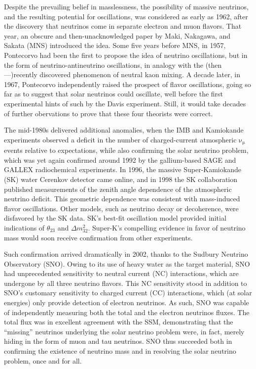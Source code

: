 \documentclass[../thesis.tex]{subfiles}
\begin{document}
Despite the prevailing belief in masslessness, the possibility of massive neutrinos, and the resulting potential for oscillations, was considered as early as 1962, after the discovery that neutrinos come in separate electron and muon flavors. That year, an obscure and then-unacknowledged paper by Maki, Nakagawa, and Sakata (MNS) introduced the idea. Some five years before MNS, in 1957, Pontecorvo had been the first to propose the idea of neutrino oscillations, but in the form of neutrino-antineutrino oscillations, in analogy with the (then---)recently discovered phenomenon of neutral kaon mixing. A decade later, in 1967, Pontecorvo independently raised the prospect of flavor oscillations, going so far as to suggest that solar neutrinos could oscillate, well before the first experimental hints of such by the Davis experiment. Still, it would take decades of further obervations to prove that these four theorists were correct.

The mid-1980s delivered additional anomalies, when the IMB and Kamiokande experiments observed a deficit in the number of charged-current atmospheric \(\mathrm{\nu_\mu}\) events relative to expectations, while also confirming the solar neutrino problem, which was yet again confirmed around 1992 by the gallium-based SAGE and GALLEX radiochemical experiments. In 1996, the massive Super-Kamiokande (SK) water Cerenkov detector came online, and in 1998 the SK collaboration published measurements of the zenith angle dependence of the atmospheric neutrino deficit. This geometric dependence was consistent with mass-induced flavor oscillations. Other models, such as neutrino decay or decoherence, were disfavored by the SK data. SK's best-fit oscillation model provided initial indications of \(\theta_{23}\) and \(\Delta m^2_{32}\). Super-K's compelling evidence in favor of neutrino mass would soon receive confirmation from other experiments.

Such confirmation arrived dramatically in 2002, thanks to the Sudbury Neutrino Observatory (SNO). Owing to its use of heavy water as the target material, SNO had unprecedented sensitivity to neutral current (NC) interactions, which are undergone by all three neutrino flavors. This NC sensitivity stood in addition to SNO's customary sensitivity to charged current (CC) interactions, which (at solar energies) only provide detection of electron neutrinos. As such, SNO was capable of independently measuring both the total and the electron neutrinos fluxes. The total flux was in excellent agreement with the SSM, demonstrating that the ``missing'' neutrinos underlying the solar neutrino problem were, in fact, merely hiding in the form of muon and tau neutrinos. SNO thus succeeded both in confirming the existence of neutrino mass and in resolving the solar neutrino problem, once and for all.
\end{document}
